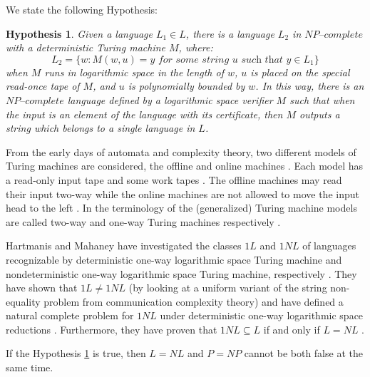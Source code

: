 \documentclass[a4paper,UKenglish,cleveref, autoref]{lipics-v2019}
\newtheorem{hypothesis}[theorem]{Hypothesis}
\begin{document}
We state the following Hypothesis:

\begin{hypothesis}
\label{hypothesis}
Given a language $L_{1} \in L$, there is a language $L_{2}$ in $\textit{NP--complete}$ with a deterministic Turing machine $M$, where:
\[L_{2} = \{w: M(w, u) = y \textit{ for some string } u \textit{ such that } y \in L_{1}\}\]
when $M$ runs in logarithmic space in the length of $w$, $u$ is placed on the special read-once tape of $M$, and $u$ is polynomially bounded by $w$. In this way, there is an $\textit{NP--complete}$ language defined by a logarithmic space verifier $M$ such that when the input is an element of the language with its certificate, then $M$ outputs a string which belongs to a single language in $L$.
\end{hypothesis}

From the early days of automata and complexity  theory,  two  different  models  of  Turing  machines  are  considered, the offline and online machines \cite{KU15}. Each model has a read-only input tape and some work tapes \cite{KU15}. The offline machines may read their input two-way while the online machines are not allowed to move the input head to the left \cite{KU15}. In the terminology of the (generalized) Turing machine models are called two-way and one-way Turing machines respectively \cite{KU15}.

Hartmanis and Mahaney have investigated the classes $1L$ and $1NL$ of languages recognizable by deterministic one-way logarithmic space Turing machine and nondeterministic one-way logarithmic space Turing machine, respectively \cite{HM81}. They have shown that $1L \neq 1NL$ (by looking at a uniform variant of the string non-equality problem from communication complexity theory) and have defined a natural complete problem for $1NL$ under deterministic one-way logarithmic space reductions \cite{HM81}. Furthermore, they have proven that $1NL \subseteq L$ if and only if $L=NL$ \cite{HM81}.

\begin{theorem}
\label{argument}
If the Hypothesis \ref{hypothesis} is true, then $L = NL$ and $P = NP$ cannot be both false at the same time.
\end{theorem}
\end{document}
